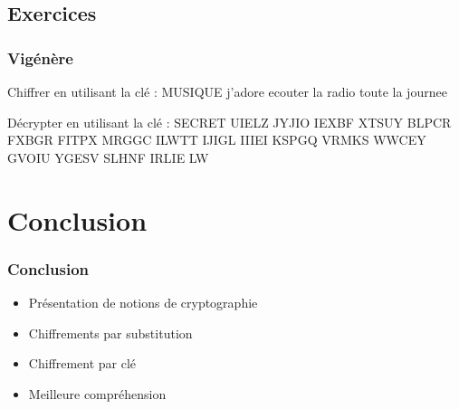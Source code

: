 \documentclass[xcolor={dvipsnames}]{beamer}
\begin{document}
\subsection{Exercices}

\begin{frame}
\frametitle{Vigénère}

\begin{block}{Chiffrer en utilisant la clé : MUSIQUE}
	j'adore ecouter la radio toute la journee
\end{block}

\begin{block}{Décrypter en utilisant la clé : SECRET}
	UIELZ JYJIO IEXBF XTSUY BLPCR FXBGR FITPX MRGGC ILWTT IJIGL IIIEI KSPGQ VRMKS WWCEY GVOIU YGESV SLHNF IRLIE LW
\end{block}
\end{frame}

\section{Conclusion}

\begin{frame}
\frametitle{Conclusion}

\begin{itemize}
	\item Présentation de notions de cryptographie
	\item Chiffrements par substitution
	\item Chiffrement par clé
	\item Meilleure compréhension
\end{itemize}
\end{frame}

\end{document}
